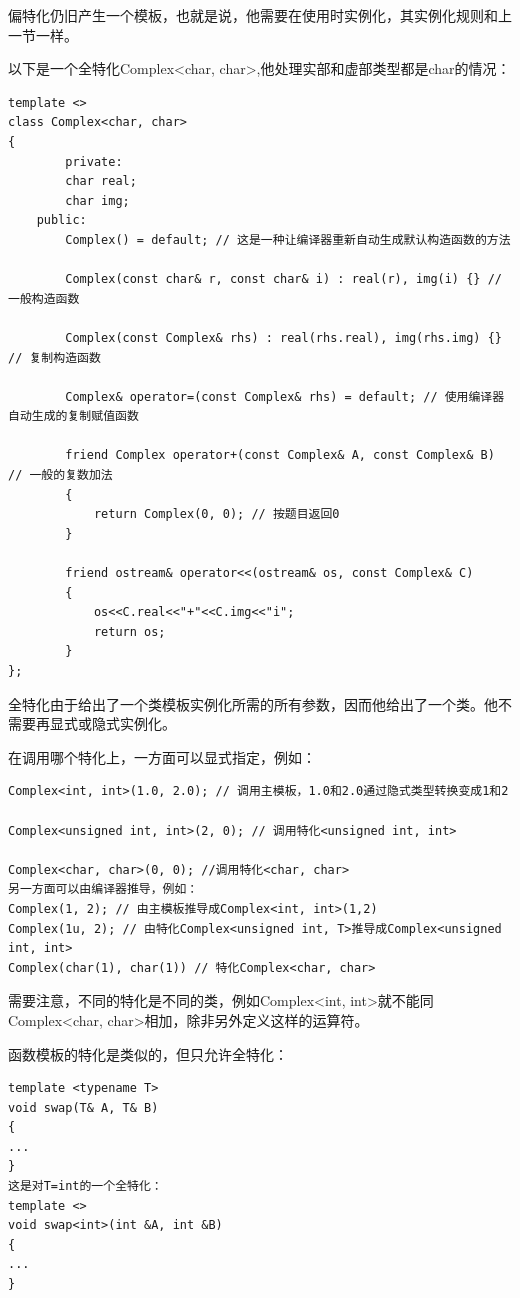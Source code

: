 \documentclass[UTF8]{ctexart}
\begin{document}
偏特化仍旧产生一个模板，也就是说，他需要在使用时实例化，其实例化规则和上一节一样。

以下是一个全特化Complex<char, char>,他处理实部和虚部类型都是char的情况：
\begin{lstlisting}
template <>
class Complex<char, char>
{
        private:
        char real;
        char img;
    public:
        Complex() = default; // 这是一种让编译器重新自动生成默认构造函数的方法
        
        Complex(const char& r, const char& i) : real(r), img(i) {} // 一般构造函数
        
        Complex(const Complex& rhs) : real(rhs.real), img(rhs.img) {} // 复制构造函数
        
        Complex& operator=(const Complex& rhs) = default; // 使用编译器自动生成的复制赋值函数

        friend Complex operator+(const Complex& A, const Complex& B) // 一般的复数加法
        {
            return Complex(0, 0); // 按题目返回0
        }

        friend ostream& operator<<(ostream& os, const Complex& C)
        {
            os<<C.real<<"+"<<C.img<<"i";
            return os;
        }
};
\end{lstlisting}

全特化由于给出了一个类模板实例化所需的所有参数，因而他给出了一个类。他不需要再显式或隐式实例化。

在调用哪个特化上，一方面可以显式指定，例如：
\begin{lstlisting}
Complex<int, int>(1.0, 2.0); // 调用主模板，1.0和2.0通过隐式类型转换变成1和2

Complex<unsigned int, int>(2, 0); // 调用特化<unsigned int, int>

Complex<char, char>(0, 0); //调用特化<char, char>
另一方面可以由编译器推导，例如：
Complex(1, 2); // 由主模板推导成Complex<int, int>(1,2)
Complex(1u, 2); // 由特化Complex<unsigned int, T>推导成Complex<unsigned int, int>
Complex(char(1), char(1)) // 特化Complex<char, char>
\end{lstlisting}

需要注意，不同的特化是不同的类，例如Complex<int, int>就不能同Complex<char, char>相加，除非另外定义这样的运算符。

函数模板的特化是类似的，但只允许全特化：
\begin{lstlisting}
template <typename T>
void swap(T& A, T& B)
{
...
}
这是对T=int的一个全特化：
template <>
void swap<int>(int &A, int &B)
{
...
}
\end{lstlisting}
\end{document}
